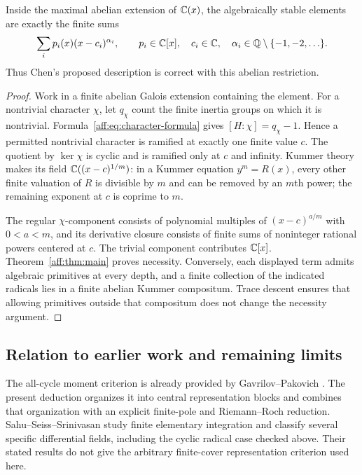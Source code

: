 \begin{corollary}
\label{aff:cor:abelian-scope}
Inside the maximal abelian extension of $\mathbb C(x)$, the algebraically stable
elements are exactly the finite sums
\[
 \sum_i p_i(x)(x-c_i)^{\alpha_i},\qquad
 p_i\in\mathbb C[x],\quad c_i\in\mathbb C,\quad
 \alpha_i\in\mathbb Q\setminus\{-1,-2,\ldots\}.
\]
Thus Chen's proposed description is correct with this abelian restriction.
\end{corollary}
\begin{proof}
Work in a finite abelian Galois extension containing the element. For a
nontrivial character $\chi$, let $q_\chi$ count the finite inertia groups on
which it is nontrivial. Formula~\eqref{aff:eq:character-formula} gives
$[H:\chi]=q_\chi-1$. Hence a permitted nontrivial character is ramified at
exactly one finite value $c$. The quotient by $\ker\chi$ is cyclic and is
ramified only at $c$ and infinity. Kummer theory makes its field
$\mathbb C((x-c)^{1/m})$: in a Kummer equation $y^m=R(x)$, every other finite
valuation of $R$ is divisible by $m$ and can be removed by an $m$th power;
the remaining exponent at $c$ is coprime to $m$.

The regular $\chi$-component consists of polynomial multiples of
$(x-c)^{a/m}$ with $0<a<m$, and its derivative closure consists of finite
sums of noninteger rational powers centered at $c$. The trivial component
contributes $\mathbb C[x]$. Theorem~\ref{aff:thm:main} proves necessity. Conversely,
each displayed term admits algebraic primitives at every depth, and a finite
collection of the indicated radicals lies in a finite abelian Kummer
compositum. Trace descent ensures that allowing primitives outside that
compositum does not change the necessity argument.
\end{proof}

\subsection{Relation to earlier work and remaining limits}

The all-cycle moment criterion is already provided by Gavrilov--Pakovich
\cite{GP2014}. The present deduction organizes it into central representation
blocks and combines that organization with an explicit finite-pole and
Riemann--Roch reduction. Sahu--Seiss--Srinivasan \cite{SSS2025} study finite
elementary integration and classify several specific differential fields,
including the cyclic radical case checked above. Their stated results do not
give the arbitrary finite-cover representation criterion used here.

